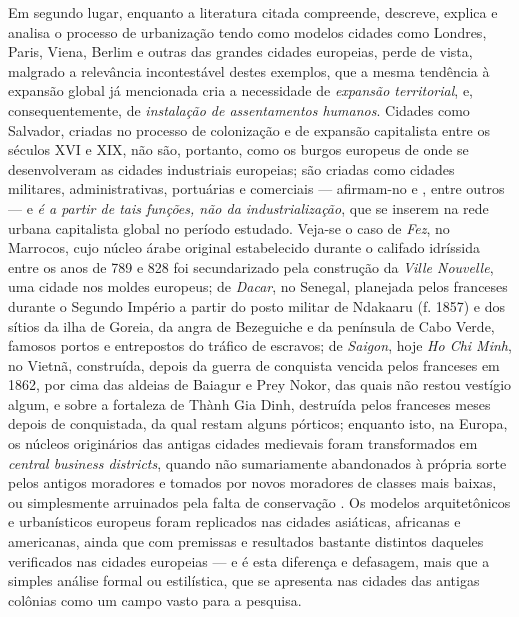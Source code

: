 Em segundo lugar, enquanto a literatura citada compreende, descreve, explica e analisa o processo de urbanização tendo como modelos cidades como Londres, Paris, Viena, Berlim e outras das grandes cidades europeias, perde de vista, malgrado a relevância incontestável destes exemplos, que a mesma tendência à expansão global já mencionada cria a necessidade de \textit{expansão territorial}, e, consequentemente, de \textit{instalação de assentamentos humanos}. Cidades como Salvador, criadas no processo de colonização e de expansão capitalista entre os séculos XVI e XIX, não são, portanto, como os burgos europeus de onde se desenvolveram as cidades industriais europeias; são criadas como cidades militares, administrativas, portuárias e comerciais --- afirmam-no  e , entre outros --- e \textit{é a partir de tais funções, não da industrialização}, que se inserem na rede urbana capitalista global no período estudado. Veja-se o caso de \textit{Fez}, no Marrocos, cujo núcleo árabe original estabelecido durante o califado idríssida entre os anos de 789 e 828 foi secundarizado pela construção da \textit{Ville Nouvelle}, uma cidade nos moldes europeus; de \textit{Dacar}, no Senegal, planejada pelos franceses durante o Segundo Império a partir do posto militar de Ndakaaru (f. 1857) e dos sítios da ilha de Goreia, da angra de Bezeguiche e da península de Cabo Verde, famosos portos e entrepostos do tráfico de escravos; de \textit{Saigon}, hoje \textit{Ho Chi Minh}, no Vietnã, construída, depois da guerra de conquista vencida pelos franceses em 1862, por cima das aldeias de Baiagur e Prey Nokor, das quais não restou vestígio algum, e sobre a fortaleza de Thành Gia Dinh, destruída pelos franceses meses depois de conquistada, da qual restam alguns pórticos; enquanto isto, na Europa, os núcleos originários das antigas cidades medievais foram transformados em \textit{central business districts}, quando não sumariamente abandonados à própria sorte pelos antigos moradores e tomados por novos moradores de classes mais baixas, ou simplesmente arruinados pela falta de conservação \cite[pp.~607-612]{benevolo_historia_1983}. Os modelos arquitetônicos e urbanísticos europeus foram replicados nas cidades asiáticas, africanas e americanas, ainda que com premissas e resultados bastante distintos daqueles verificados nas cidades europeias --- e é esta diferença e defasagem, mais que a simples análise formal ou estilística, que se apresenta nas cidades das antigas colônias como um campo vasto para a pesquisa.

